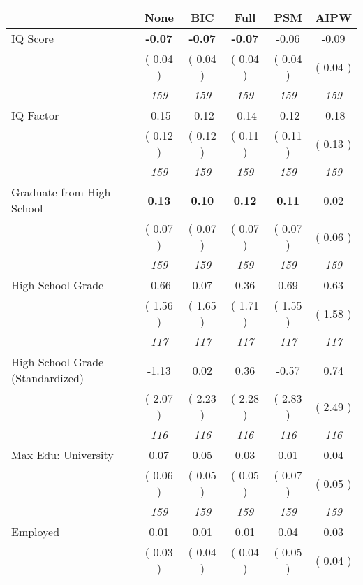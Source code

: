 \begin{tabular}{l c c c c c}
\toprule
 & None & BIC & Full & PSM & AIPW \\
\midrule
IQ Score & \textbf{     -0.07 } & \textbf{     -0.07 } & \textbf{     -0.07 } &     -0.06 &     -0.09 \\
& (     0.04 ) & (     0.04 ) & (     0.04 ) & (     0.04 ) & (     0.04 ) \\
& \textit{ 159 } & \textit{ 159 } & \textit{ 159 } & \textit{ 159 } & \textit{ 159 } \\
IQ Factor &     -0.15 &     -0.12 &     -0.14 &     -0.12 &     -0.18 \\
& (     0.12 ) & (     0.12 ) & (     0.11 ) & (     0.11 ) & (     0.13 ) \\
& \textit{ 159 } & \textit{ 159 } & \textit{ 159 } & \textit{ 159 } & \textit{ 159 } \\
Graduate from High School & \textbf{      0.13 } & \textbf{      0.10 } & \textbf{      0.12 } & \textbf{     0.11} &      0.02 \\
& (     0.07 ) & (     0.07 ) & (     0.07 ) & (     0.07 ) & (     0.06 ) \\
& \textit{ 159 } & \textit{ 159 } & \textit{ 159 } & \textit{ 159 } & \textit{ 159 } \\
High School Grade &     -0.66 &      0.07 &      0.36 &      0.69 &      0.63 \\
& (     1.56 ) & (     1.65 ) & (     1.71 ) & (     1.55 ) & (     1.58 ) \\
& \textit{ 117 } & \textit{ 117 } & \textit{ 117 } & \textit{ 117 } & \textit{ 117 } \\
High School Grade (Standardized) &     -1.13 &      0.02 &      0.36 &     -0.57 &      0.74 \\
& (     2.07 ) & (     2.23 ) & (     2.28 ) & (     2.83 ) & (     2.49 ) \\
& \textit{ 116 } & \textit{ 116 } & \textit{ 116 } & \textit{ 116 } & \textit{ 116 } \\
Max Edu: University &      0.07 &      0.05 &      0.03 &      0.01 &      0.04 \\
& (     0.06 ) & (     0.05 ) & (     0.05 ) & (     0.07 ) & (     0.05 ) \\
& \textit{ 159 } & \textit{ 159 } & \textit{ 159 } & \textit{ 159 } & \textit{ 159 } \\
Employed &      0.01 &      0.01 &      0.01 &      0.04 &      0.03 \\
& (     0.03 ) & (     0.04 ) & (     0.04 ) & (     0.05 ) & (     0.04 ) \\

\end{tabular}

